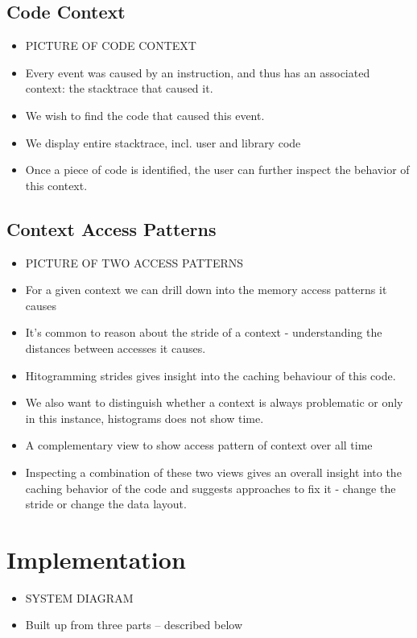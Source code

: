 \documentclass[annual]{acmsiggraph}
\begin{document}
  \subsection{Code Context}
    \begin{itemize}
      \item PICTURE OF CODE CONTEXT
      \item Every event was caused by an instruction, and thus has an associated context: the stacktrace that caused it.
      \item We wish to find the code that caused this event.
      \item We display entire stacktrace, incl. user and library code
      \item Once a piece of code is identified, the user can further inspect the behavior of this context.
    \end{itemize}
  
  \subsection{Context Access Patterns}
    \begin{itemize}
      \item PICTURE OF TWO ACCESS PATTERNS
      \item For a given context we can drill down into the memory access patterns it causes
      \item It's common to reason about the stride of a context - understanding the distances between accesses it causes.
      \item Hitogramming strides gives insight into the caching behaviour of this code.
      \item We also want to distinguish whether a context is always problematic or only in this instance, histograms does not show time.
      \item A complementary view to show access pattern of context over all time
      \item Inspecting a combination of these two views gives an overall insight into the caching behavior of the code and suggests approaches to fix it - change the stride or change the data layout.
    \end{itemize}

\section {Implementation}
  \begin{itemize}
    \item SYSTEM DIAGRAM
    \item Built up from three parts -- described below
  \end{itemize}
\end{document}
